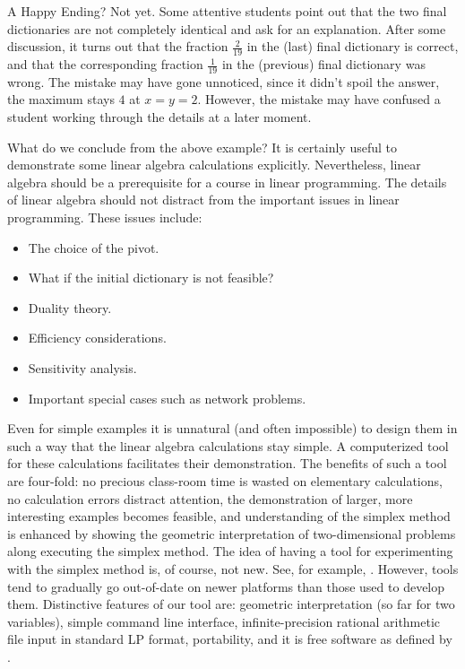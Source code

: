 \documentclass[ukenglish,a4]{article}
\begin{document}
A Happy Ending? Not yet. Some attentive students point out that the two final dictionaries
are not completely identical and ask for an explanation. After some discussion, it turns
out that the fraction $\frac{2}{19}$ in the (last) final dictionary is correct,
and that the corresponding fraction $\frac{1}{19}$ in the (previous) final dictionary was wrong.
The mistake may have gone unnoticed, since it didn't spoil the answer, the maximum stays
$4$ at $x=y=2$. However, the mistake may have confused a student working through the details at a later moment.

\label{motivation}
What do we conclude from the above example? It is certainly useful to demonstrate some
linear algebra calculations explicitly. Nevertheless, linear algebra should be a prerequisite for a course
in linear programming. The details of linear algebra should not distract from the important
issues in linear programming. These issues include:
\begin{itemize}
\item The choice of the pivot.
\item What if the initial dictionary is not feasible?
\item Duality theory.
\item Efficiency considerations.
\item Sensitivity analysis.
\item Important special cases such as network problems.
\end{itemize}
Even for simple examples it is unnatural (and often impossible)
to design them in such a way that the linear algebra calculations stay simple.
A computerized tool for these calculations facilitates their demonstration.
The benefits of such a tool are four-fold: no precious class-room time is wasted
on elementary calculations, no calculation errors distract attention,
the demonstration of larger, more interesting examples becomes feasible, and 
understanding of the simplex method is enhanced by showing the geometric interpretation of two-dimensional problems along executing the simplex method.
The idea of having a tool
for experimenting with the simplex method is, of course, not new. 
See, for example, \cite{SimplexPivotTool, AdvancedPivotTool}.
However, tools tend to gradually go out-of-date on newer platforms
than those used to develop them. Distinctive features of our tool are: 
geometric interpretation (so far for two variables),
simple command line interface,
infinite-precision rational arithmetic  
file input in standard LP format,
portability, 
and it is free software as defined by \cite{freesw}.
\end{document}

